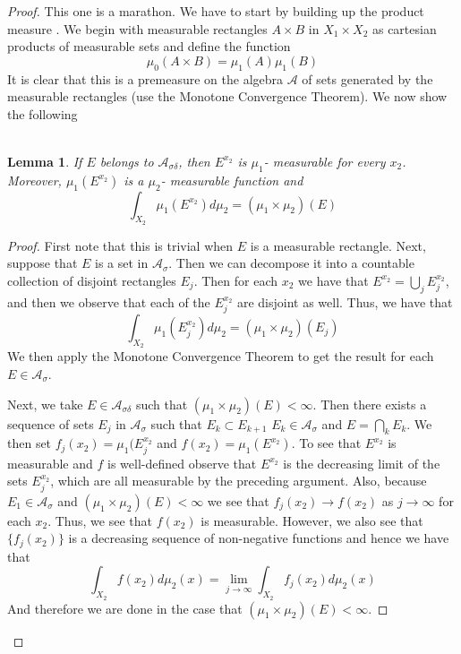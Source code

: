 \documentclass{article}
\newtheorem*{lem}{\\ Lemma}
\begin{document}
\begin{proof}
  This one is a marathon. We have to start by building up the product
  measure . We begin with measurable rectangles $A \times B $ in $X_1
  \times X_2$ as cartesian products of measurable sets and define the
  function
  \[
  \mu_0(A\times B) = \mu_1(A)\mu_1(B)
  \]
  It is clear that this is a premeasure on the algebra $\mathcal{A}$
  of sets generated by the measurable rectangles (use the Monotone
  Convergence Theorem). We now show the following
  \begin{lem}
    If $E$ belongs to $\mathcal{A}_{\sigma\delta}$, then $E^{x_2}$ is
    $\mu_1$- measurable for every $x_2$. Moreover, $\mu_1(E^{x_2})$ is
    a $\mu_2$- measurable function and
    \[
    \int_{X_2}\mu_1(E^{x_2})d\mu_2 = (\mu_1\times \mu_2)(E)
    \]
  \end{lem}
  \begin{proof}
    First note that this is trivial when $E$ is a measurable
    rectangle. Next, suppose that $E$ is a set in
    $\mathcal{A_\sigma}$. Then we can decompose it into a countable
    collection of disjoint rectangles $E_j$. Then for each $x_2$ we
    have that $E^{x_2} = \bigcup_j E_j^{x_2}$, and then we observe
    that each of the $E_j^{x_2}$ are disjoint as well. Thus, we have
    that
    \[
    \int_{X_2}\mu_1(E_j^{x_2})d\mu_2 = (\mu_1\times \mu_2)(E_j)
    \]
    We then apply the Monotone Convergence Theorem to get the result
    for each $E \in \mathcal{A}_\sigma$.

    Next, we take $E \in \mathcal{A}_{\sigma\delta}$ such that
    $(\mu_1\times \mu_2)(E)<\infty$. Then there exists a sequence of
    sets $E_j$ in $\mathcal{A_\sigma}$ such that $E_k \subset E_{k+1}$
    $E_k\in\mathcal{A_ \sigma}$ and $E = \bigcap_k E_k$. We then set
    $f_j(x_2) = \mu_1(E_j^{x_2}$ and $f(x_2) = \mu_1(E^{x_2})$. To see
    that $E^{x_2}$ is measurable and $f$ is well-defined observe that
    $E^{x_2}$ is the decreasing limit of the sets $E_j^{x_2}$, which
    are all measurable by the preceding argument.  Also, because $E_1
    \in \mathcal{A_\sigma}$ and $(\mu_1\times\mu_2)(E) < \infty$ we
    see that $f_j(x_2) \to f(x_2)$ as $j\to\infty$ for each $x_2$.
    Thus, we see that $f(x_2)$ is measurable. However, we also see
    that $\{f_j(x_2)\}$ is a decreasing sequence of non-negative
    functions and hence we have that
    \[
    \int_{X_2}f(x_2)d\mu_2(x) = \lim_{j\to\infty}\int_{X_2}f_j(x_2)d\mu_2(x)
    \]
    And therefore we are done in the case that $(\mu_1\times\mu_2)(E)
    < \infty$.


\end{proof}
\end{proof}
\end{document}
